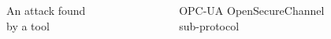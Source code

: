 \documentclass{beamer}
\newcommand{\opcua}{OPC-UA\xspace}
\begin{document}
\begin{frame}[fragile]{}
\begin{tcolorbox}[adjusted title={\centering\large Formal Analysis of Industrial Protocols}]
\begin{columns}[T]
\begin{column}{.65\textwidth}
\begin{tcolorbox}
\begin{columns}[c]
                        \begin{column}{.45\textwidth}
                            \begin{figure}[htb]
                                \vspace{-1.25em}
                                \caption{An attack found by a tool}
                            \end{figure}
                        \end{column}
                        \begin{column}{.55\textwidth}
                            \begin{figure}[htb]
                                \vspace{-1.25em}
                                \caption{\opcua OpenSecureChannel sub-protocol}
                            \end{figure}
                        \end{column}
                    \end{columns}
                \end{tcolorbox}
            \end{column}
        \end{columns}
    \end{tcolorbox}

\end{frame}
\end{document}
